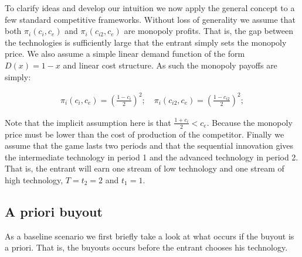 \documentclass[11pt]{article}
\begin{document}
To clarify ideas and develop our intuition we now apply the general concept to a few standard competitive frameworks. Without loss of generality we assume that both $\pi_i(c_i,c_e)$ and
$\pi_i(c_{i2},c_e)$ are monopoly profits. That is, the gap between the technologies is sufficiently large that the entrant simply sets the monopoly price. We also assume a simple linear demand function of the form $D(x)=1-x$ and linear cost structure.  As such the monopoly payoffs are simply: 

\begin{align*}
\pi_i(c_i,c_e) = 
\left(\frac{1-c_i}{2}\right)^2; \quad \pi_i(c_{i2},c_e) = \left(\frac{1-c_{i2}}{2}\right)^2;  
\end{align*}

Note that the implicit assumption here is that $\frac{1+c_i}{2}<c_e$. Because the monopoly price must be lower than the cost of production of the competitor. Finally we assume that the game lasts two periods and that the sequential innovation gives the intermediate technology in period 1 and the advanced technology in period 2. That is, the entrant will earn one stream of low technology and one stream of high technology, $T=t_2=2$ and $t_1=1$.

\subsection*{A priori buyout}

As a baseline scenario we first briefly take a look at what occurs if the buyout is a priori. That is, the buyouts occurs before the entrant chooses his technology. 
\end{document}
